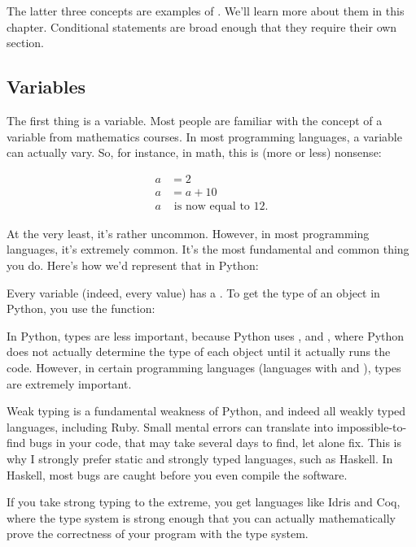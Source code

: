 The latter three concepts are examples of . We'll learn more about them in this
chapter. Conditional statements are broad enough that they require
their own section.

\subsection{Variables}

The first thing is a variable. Most people are familiar with the
concept of a variable from mathematics courses. In most programming
languages, a variable can actually vary. So, for instance, in math,
this is (more or less) nonsense:

\begin{align*}
  a & = 2 \\
  a & = a + 10 \\
  a & \text{ is now equal to 12.}
\end{align*}

At the very least, it's rather uncommon. However, in most programming
languages, it's extremely common. It's the most fundamental and common
thing you do. Here's how we'd represent that in Python:


Every variable (indeed, every value) has a . To get the
type of an object in Python, you use the  function:


\begin{remark}
  In Python, types are less important, because Python uses , and , where Python does not actually
  determine the type of each object until it actually runs the
  code. However, in certain programming languages (languages with
   and ), types are extremely
  important.

  Weak typing is a fundamental weakness of Python, and indeed all
  weakly typed languages, including Ruby. Small mental errors can
  translate into impossible-to-find bugs in your code, that may take
  several days to find, let alone fix. This is why I strongly prefer
  static and strongly typed languages, such as Haskell. In Haskell,
  most bugs are caught before you even compile the software.

  If you take strong typing to the extreme, you get languages like
  Idris and Coq, where the type system is strong enough that you can
  actually mathematically prove the correctness of your program with
  the type system.
\end{remark}

